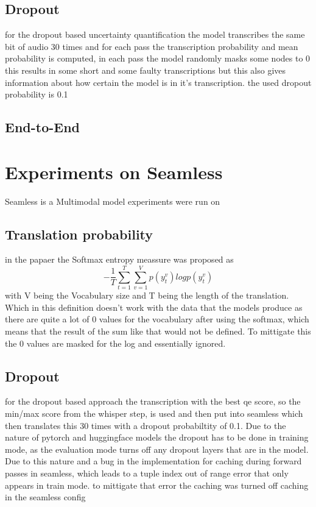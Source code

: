 \section{Dropout}
for the dropout based uncertainty quantification the model transcribes the same bit of audio 30 times and for each pass the transcription probability and mean probability is computed, in each pass the model randomly masks some nodes to 0
this results in some short and some faulty transcriptions but this also gives information about how certain the model is in it's transcription. the used dropout probability is 0.1 


\section{End-to-End}


\chapter{Experiments on Seamless}
Seamless is a Multimodal model 
experiments were run on \cite{seamless2023}


\section{Translation probability}
in the \cite{fomicheva2020unsupervised} papaer the Softmax entropy meassure was proposed as $$-\frac{1}{T}\sum_{t=1}^T\sum_{v=1}^Vp(y_t^v)logp(y_t^v)$$ with V being the Vocabulary size and T being the length of the translation. Which in this definition doesn't work with the data that the models produce as there are quite a lot of 0 values for the vocabulary after using the softmax, which means that the result of the sum like that would not be defined. To mittigate this the 0 values are masked for the log and essentially ignored. 


\section{Dropout}
for the dropout based approach the transcription with the best qe score, so the min/max score from the whisper step, is used 
and then put into seamless which then translates this 30 times with a dropout probabiltity of 0.1.
Due to the nature of pytorch and huggingface models the dropout has to be done in training mode, as the evaluation mode turns off any dropout layers that are in the model. Due to this nature and a bug in the implementation for caching during forward passes in seamless, which leads to a tuple index out of range error that only appears in train mode. to mittigate that error the caching was turned off caching in the seamless config


